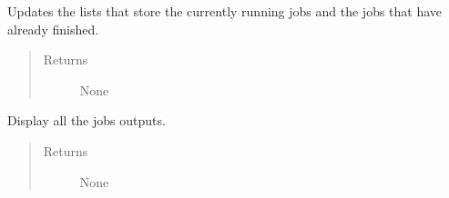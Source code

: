 \documentclass[a4paper,10pt,english]{sphinxmanual}
\begin{document}
\begin{fulllineitems}
\begin{fulllineitems}
\end{fulllineitems}


\begin{fulllineitems}
\label{\detokenize{apidoc_commands/commands:commands.jobs.Jobs.update_jobs_states_list}}
Updates the lists that store the currently
running jobs and the jobs that have already finished.
\begin{quote}\begin{description}
\item[{Returns}] \leavevmode
None

\end{description}\end{quote}

\end{fulllineitems}


\begin{fulllineitems}
\label{\detokenize{apidoc_commands/commands:commands.jobs.Jobs.write_all_results}}
Display all the jobs outputs.
\begin{quote}\begin{description}
\item[{Returns}] \leavevmode
None

\end{description}\end{quote}

\end{fulllineitems}


\end{fulllineitems}

\end{document}
